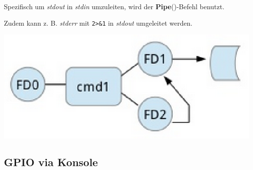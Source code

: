 \documentclass[
  9pt,
  a4paperpaper,
  DIV=11]{scrartcl}
\newenvironment{Shaded}{}{}
\newcommand{\NormalTok}[1]{\textcolor[rgb]{0.14,0.16,0.18}{#1}}
\numberwithin{equation}{section}
\begin{document}
\begin{multicols}{2}
\begin{tcolorbox}
\begin{tcolorbox}
\begin{tcolorbox}
\begin{tcolorbox}
\begin{tcolorbox}
\begin{tcolorbox}
\begin{Shaded}
\end{Shaded}

Spezifisch um \emph{stdout} in \emph{stdin} umzuleiten, wird der
\textbf{Pipe}(\textbar)-Befehl benutzt.

\begin{Shaded}
\end{Shaded}

Zudem kann z. B. \emph{stderr} mit \texttt{2\textgreater{}\&1} in
\emph{stdout} umgeleitet werden.

\begin{Shaded}
\end{Shaded}

\includegraphics{images/RedirectedERR.png}

\hypertarget{gpio-via-konsole}{%
\subsection{GPIO via Konsole}\label{gpio-via-konsole}}


\end{tcolorbox}
\end{tcolorbox}
\end{tcolorbox}
\end{tcolorbox}
\end{tcolorbox}
\end{tcolorbox}
\end{multicols}
\end{document}
